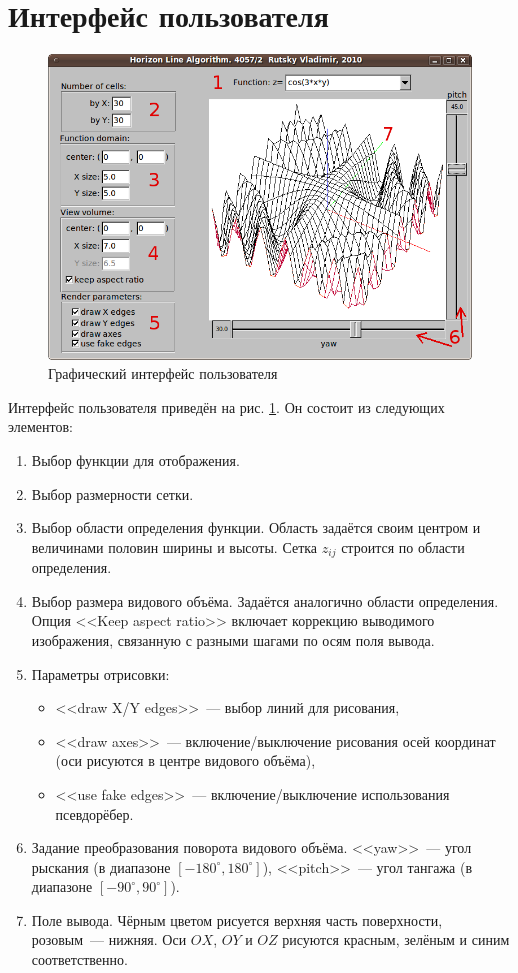 \documentclass[a4paper,10pt]{article}
\begin{document}
\section{Интерфейс пользователя}
\begin{figure}[h!]
  \centering
  \includegraphics[width=0.8\linewidth]{./screenshots/ui_w-notes.png}
  \caption{Графический интерфейс пользователя}
  \label{fig:gui}
\end{figure}

Интерфейс пользователя приведён на рис. \ref{fig:gui}.
Он состоит из следующих элементов:
\begin{enumerate}
  \item Выбор функции для отображения.
  \item Выбор размерности сетки.
  \item Выбор области определения функции. 
    Область задаётся своим центром и величинами половин ширины и высоты.
    Сетка $z_{ij}$ строится по области определения.
  \item Выбор размера видового объёма.
    Задаётся аналогично области определения.
    Опция <<Keep aspect ratio>> включает коррекцию выводимого изображения, 
    связанную с разными шагами по осям поля вывода.
  \item Параметры отрисовки:
    \begin{itemize}
      \item <<draw X/Y edges>>~--- выбор линий для рисования,
      \item <<draw axes>>~--- включение/выключение рисования осей координат
        (оси рисуются в центре видового объёма),
      \item <<use fake edges>>~--- включение/выключение использования псевдорёбер.
    \end{itemize}
  \item Задание преобразования поворота видового объёма.
    <<yaw>>~--- угол рыскания (в диапазоне $[-180^{\circ}, 180^{\circ}]$),
    <<pitch>>~--- угол тангажа (в диапазоне $[-90^{\circ}, 90^{\circ}]$).
  \item Поле вывода.
    Чёрным цветом рисуется верхняя часть поверхности, 
    розовым~--- нижняя. 
    Оси $OX$, $OY$ и $OZ$ рисуются красным, зелёным и синим соответственно.
\end{enumerate}
\end{document}
